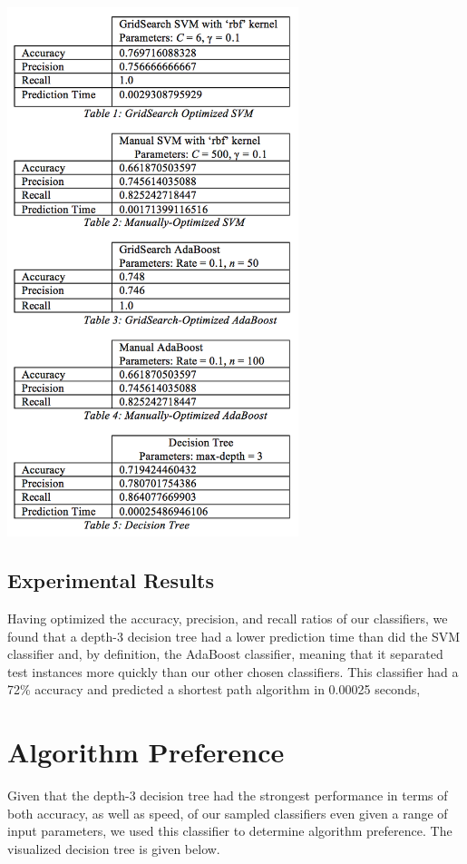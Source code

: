 \documentclass{article}
\begin{document}
\includegraphics[width=8.5cm]{tables}

\subsection{Experimental Results}

Having optimized the accuracy, precision, and recall ratios of our classifiers, we found that a depth-3 decision tree had a lower prediction time than did the SVM classifier and, by definition, the AdaBoost classifier, meaning that it separated test instances more quickly than our other chosen classifiers. This classifier had a 72\% accuracy and predicted a shortest path algorithm in 0.00025 seconds,

\section{Algorithm Preference}

Given that the depth-3 decision tree had the strongest performance in terms of both accuracy, as well as speed, of our sampled classifiers even given a range of input parameters, we used this classifier to determine algorithm preference. The visualized decision tree is given below.
\end{document}
